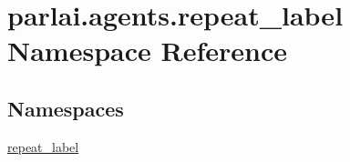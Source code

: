 \hypertarget{namespaceparlai_1_1agents_1_1repeat__label}{}\section{parlai.\+agents.\+repeat\+\_\+label Namespace Reference}
\label{namespaceparlai_1_1agents_1_1repeat__label}
\subsection*{Namespaces}
\begin{DoxyCompactItemize}
\item 
 \hyperlink{namespaceparlai_1_1agents_1_1repeat__label_1_1repeat__label}{repeat\+\_\+label}
\end{DoxyCompactItemize}
